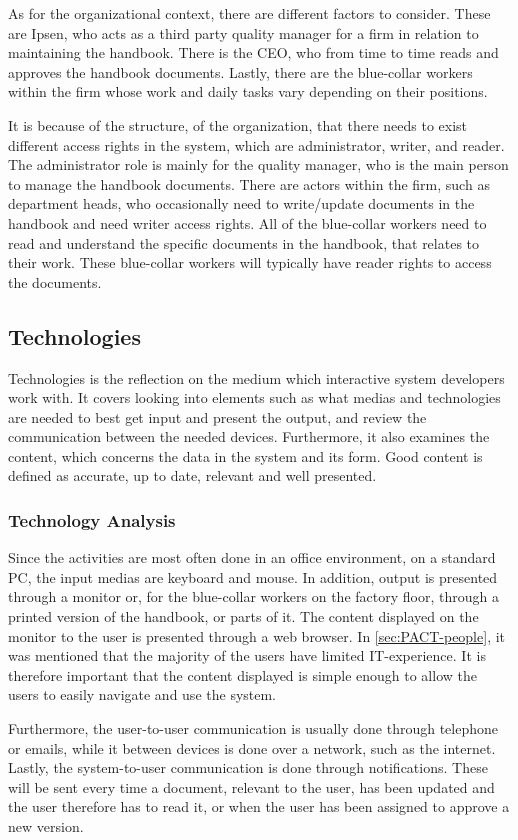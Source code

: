 As for the organizational context, there are different factors to consider.
These are Ipsen, who acts as a third party quality manager for a firm in relation to maintaining the handbook.
There is the CEO, who from time to time reads and approves the handbook documents.
Lastly, there are the blue-collar workers within the firm whose work and daily tasks vary depending on their positions.

It is because of the structure, of the organization, that there needs to exist different access rights in the system, which are administrator, writer, and reader.
The administrator role is mainly for the quality manager, who is the main person to manage the handbook documents.
There are actors within the firm, such as department heads, who occasionally need to write/update documents in the handbook and need writer access rights.
All of the blue-collar workers need to read and understand the specific documents in the handbook, that relates to their work.
These blue-collar workers will typically have reader rights to access the documents.
\subsection{Technologies}
Technologies is the reflection on the medium which interactive system developers work with.
It covers looking into elements such as what medias and technologies are needed to best get input and present the output, and review the communication between the needed devices.
Furthermore, it also examines the content, which concerns the data in the system and its form.
Good content is defined as accurate, up to date, relevant and well presented.

\subsubsection*{Technology Analysis}
Since the activities are most often done in an office environment, on a standard PC, the input medias are keyboard and mouse.
In addition, output is presented through a monitor or, for the blue-collar workers on the factory floor, through a printed version of the handbook, or parts of it.
The content displayed on the monitor to the user is presented through a web browser.
In \cref{sec:PACT-people}, it was mentioned that the majority of the users have limited IT-experience.
It is therefore important that the content displayed is simple enough to allow the users to easily navigate and use the system.

Furthermore, the user-to-user communication is usually done through telephone or emails, while it between devices is done over a network, such as the internet.
Lastly, the system-to-user communication is done through notifications.
These will be sent every time a document, relevant to the user, has been updated and the user therefore has to read it, or when the user has been assigned to approve a new version.
